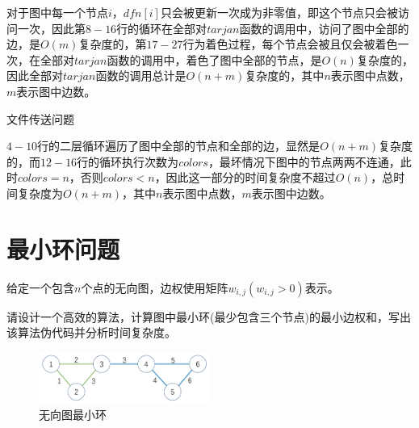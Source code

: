 \documentclass{article}
\begin{document}
对于图中每一个节点$i$，$dfn[i]$只会被更新一次成为非零值，即这个节点只会被访问一次，因此第$8-16$行的循环在全部对$tarjan$函数的调用中，访问了图中全部的边，是$O(m)$复杂度的，第$17-27$行为着色过程，每个节点会被且仅会被着色一次，在全部对$tarjan$函数的调用中，着色了图中全部的节点，是$O(n)$复杂度的，因此全部对$tarjan$函数的调用总计是$O(n+m)$复杂度的，其中$n$表示图中点数，$m$表示图中边数。

\begin{algorithm}[H]

\caption{文件传送问题}
\LinesNumbered
{}


\end{algorithm}

$4-10$行的二层循环遍历了图中全部的节点和全部的边，显然是$O(n+m)$复杂度的，而$12-16$行的循环执行次数为$colors$，最坏情况下图中的节点两两不连通，此时$colors=n$，否则$colors<n$，因此这一部分的时间复杂度不超过$O(n)$，总时间复杂度为$O(n+m)$，其中$n$表示图中点数，$m$表示图中边数。

\section{最小环问题}

给定一个包含$n$个点的无向图，边权使用矩阵$w_{i,j}(w_{i,j}>0)$表示。

请设计一个高效的算法，计算图中最小环(最少包含三个节点)的最小边权和，写出该算法伪代码并分析时间复杂度。

\begin{figure}[H]
\centering
\includegraphics[width=0.5\textwidth]{algorithm_pic1.jpg}
\caption{无向图最小环}
\label{无向图最小环}
\end{figure}
\end{document}
